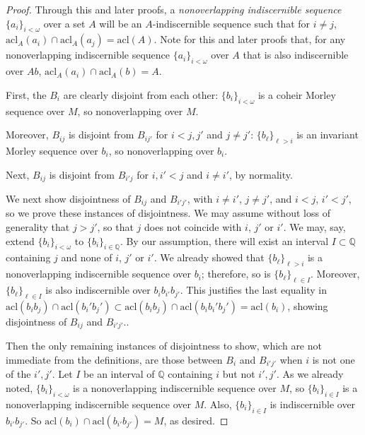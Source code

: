 \documentclass{amsart}
\theoremstyle{definition}
\theoremstyle{remark}
\numberwithin{equation}{section}
\begin{document}
\begin{proof}
    Through this and later proofs, a \textit{nonoverlapping indiscernible sequence} $\{a_{i}\}_{i < \omega}$ over a set $A$ will be an $A$-indiscernible sequence such that for $i \neq j$, $\mathrm{acl}_{A}(a_{i}) \cap \mathrm{acl}_{A}(a_{j}) = \mathrm{acl}(A)$. Note for this and later proofs that, for any nonoverlapping indiscernible sequence $\{a_{i}\}_{i < \omega}$ over $A$ that is also indiscernible over $Ab$, $\mathrm{acl}_{A}(a_{i}) \cap \mathrm{acl}_{A}(b) = A$. 
    
    First, the $B_{i}$ are clearly disjoint from each other: $\{b_{i}\}_{i< \omega}$ is a coheir Morley sequence over $M$, so nonoverlapping over $M$.
    
    Moreover, $B_{ij}$ is disjoint from $B_{ij'}$ for  $i < j, j'$ and $j \neq j'$: $\{b_{\ell}\}_{\ell > i}$ is an invariant Morley sequence over $b_{i}$, so nonoverlapping over $b_{i}$. 
    
Next, $B_{ij}$ is disjoint from $B_{i'j}$ for $i, i' < j$ and $i \neq i'$, by normality. 

We next show disjointness of $B_{ij}$ and $B_{i'j'}$, with  $i \neq i'$, $j \neq j'$, and $i < j$, $i' < j'$, so we prove these instances of disjointness. We may assume without loss of generality that $j > j'$, so that $j$ does not coincide with $i$, $j'$ or $i'$. We may, say, extend $\{ b_{i} \}_{i < \omega}$ to $\{ b_{i} \}_{i \in \mathbb{Q}}$. By our assumption, there will exist an interval $I \subset \mathbb{Q}$ containing $j$ and none of $i$, $j'$ or $i'$. We already showed that $\{b_{\ell}\}_{\ell > i}$ is a nonoverlapping indiscernible sequence over $b_{i}$; therefore, so is $\{b_{\ell}\}_{\ell \in I}$. Moreover, $\{b_{\ell}\}_{\ell \in I}$ is also indiscernible over $b_{i}b_{i'}b_{j'}$. This justifies the last equality in $\mathrm{acl}(b_ib_{j}) \cap \mathrm{acl}(b_i'b_j')\subset \mathrm{acl}(b_ib_{j}) \cap \mathrm{acl}(b_ib_i'b_j') =\mathrm{acl}(b_{i})$, showing disjointness of $B_{ij}$ and $B_{i'j'}$..

Then the only remaining instances of disjointness to show, which are not immediate from the definitions, are those between $B_{i}$ and $B_{i'j'}$ when $i$ is not one of the $i', j'$. Let $I$ be an interval of $\mathbb{Q}$ containing $i$ but not $i', j'$. As we already noted, $\{b_{i}\}_{i < \omega}$ is a nonoverlapping indiscernible sequence over $M$, so $\{b_{i}\}_{i \in I}$ is a nonoverlapping indiscernible sequence over $M$. Also, $\{b_{i}\}_{i \in I}$ is indiscernible over $b_{i'}b_{j'}$. So $\mathrm{acl}(b_{i}) \cap \mathrm{acl}(b_{i'}b_{j'}) = M$, as desired.
\end{proof}
\end{document}
